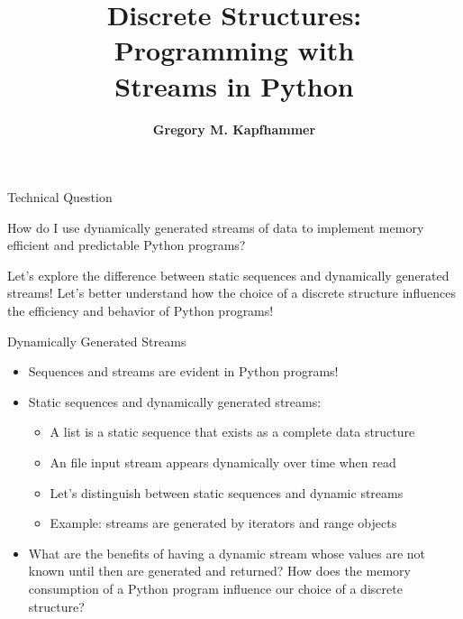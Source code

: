 \documentclass[14pt,aspectratio=169]{beamer}
\title{Discrete Structures: \\ Programming with \\ Streams in Python}
\author{{\bf Gregory M. Kapfhammer}}
\institute[shortinst]{{\bf Department of Computer Science, Allegheny College}}
\begin{document}
{
  \begin{frame}
    \titlepage
  \end{frame}
}

%
\begin{frame}{Technical Question}
  \hspace*{.25in}
  \begin{minipage}{4.8in}
    \vspace*{.1in}
    \begin{center}
      {\large How do I use dynamically generated streams of data to implement
      memory efficient and predictable Python programs?}
    \end{center}
  \end{minipage}
  \vspace{2ex}
  \begin{center}
    \small Let's explore the difference between static sequences and dynamically
    generated streams! Let's better understand how the choice of a discrete
    structure influences the efficiency and behavior of Python programs!
  \end{center}
\end{frame}

%
\begin{frame}{Dynamically Generated Streams}
  \begin{itemize}
    \item Sequences and streams are evident in Python programs!
      \vspace*{-.15in}
    \item Static sequences and dynamically generated streams:
      \begin{itemize}
        \item A list is a static sequence that exists as a complete data
          structure
        \item An file input stream appears dynamically over time when read
        \item Let's distinguish between static sequences and dynamic streams
        \item Example: streams are generated by iterators and range objects
      \end{itemize}
      \vspace*{-.2in}
    \item What are the benefits of having a dynamic stream whose values are not
      known until then are generated and returned? How does the memory
      consumption of a Python program influence our choice of a discrete
      structure?
  \end{itemize}
\end{frame}
\end{document}
